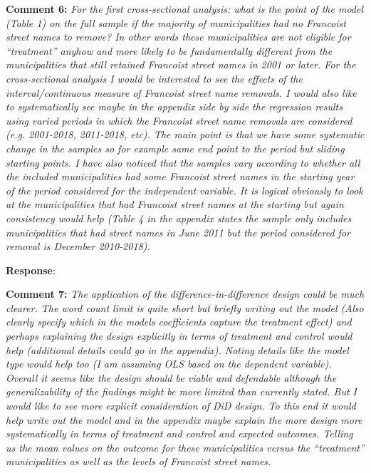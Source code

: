 \documentclass[12pt, a4paper, notitlepage]{article}
\begin{document}
\textbf{Comment 6:} \textit{For the first cross-sectional analysis: what is the point of the model (Table 1) on the full sample if the majority of municipalities had no Francoist street names to remove? In other words these municipalities are not eligible for “treatment” anyhow and more likely to be fundamentally different from the municipalities that still retained Francoist street names in 2001 or later. For the cross-sectional analysis I would be interested to see the effects of the interval/continuous measure of Francoist street name removals. I would also like to systematically see maybe in the appendix side by side the regression results using varied periods in which the Francoist street name removals are considered (e.g. 2001-2018, 2011-2018, etc). The main point is that we have some systematic change in the samples so for example same end point to the period but sliding starting points. I have also noticed that the samples vary according to whether all the included municipalities had some Francoist street names in the starting year of the period considered for the independent variable. It is logical obviously to look at the municipalities that had Francoist street names at the starting but again consistency would help (Table 4 in the appendix states the sample only includes municipalities that had street names in June 2011 but the period considered for removal is December 2010-2018).}

\textbf{Response}: {\color{red}{pending}}

\textbf{Comment 7:} \textit{The application of the difference-in-difference design could be much clearer. The word count limit is quite short but briefly writing out the model (Also clearly specify which in the models coefficients capture the treatment effect) and perhaps explaining the design explicitly in terms of treatment and control would help (additional details could go in the appendix). Noting details like the model type would help too (I am assuming OLS based on the dependent variable). Overall it seems like the design should be viable and defendable although the generalizability of the findings might be more limited than currently stated. But I would like to see more explicit consideration of DiD design. To this end it would help write out the model and in the appendix maybe explain the more design more systematically in terms of treatment and control and expected outcomes. Telling us the mean values on the outcome for these municipalities versus the “treatment” municipalities as well as the levels of Francoist street names.}
\end{document}
